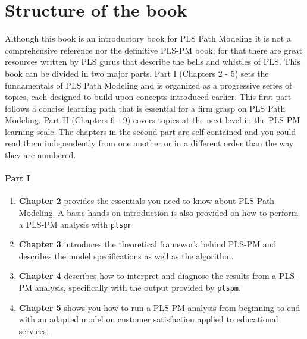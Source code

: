 \documentclass[12pt]{book}\usepackage{graphicx, color}
\newcommand{\plspm}{\texttt{plspm}}
\begin{document}
\section{Structure of the book}
Although this book is an introductory book for PLS Path Modeling it is not a comprehensive reference nor the definitive PLS-PM book; for that there are great resources written by PLS gurus that describe the bells and whistles of PLS. This book can be divided in two major parts. Part I (Chapters 2 - 5) sets the fundamentals of PLS Path Modeling and is organized as a progressive series of topics, each designed to build upon concepts introduced earlier. This first part follows a concise learning path that is essential for a firm grasp on PLS Path Modeling. Part II (Chapters 6 - 9) covers topics at the next level in the PLS-PM learning scale. The chapters in the second part are self-contained and you could read them independently from one another or in a different order than the way they are numbered.

\paragraph{Part I}
\begin{enumerate}[leftmargin=*]
 \item[] \textbf{Chapter 2} provides the essentials you need to know about PLS Path Modeling. A basic hands-on introduction is also provided on how to perform a PLS-PM analysis with \plspm{}
 
  \item[] \textbf{Chapter 3} introduces the theoretical framework behind PLS-PM and describes the model specifications as well as the algorithm. 
  
  \item[] \textbf{Chapter 4} describes how to interpret and diagnose the results from a PLS-PM analysis, specifically with the output provided by \plspm{}.

  \item[] \textbf{Chapter 5} shows you how to run a PLS-PM analysis from beginning to end with an adapted model on customer satisfaction applied to educational services.
\end{enumerate}
\end{document}
